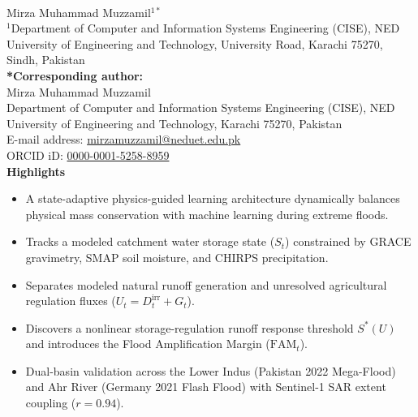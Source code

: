 \documentclass[11pt,a4paper,fleqn]{article}
\begin{document}
\pagestyle{plain}
\thispagestyle{plain}


\begin{singlespace}
\\[1.5em]

\noindent Mirza Muhammad Muzzamil$^{1*}$\\[0.8em]

\noindent $^1$Department of Computer and Information Systems Engineering (CISE), NED University of Engineering and Technology, University Road, Karachi 75270, Sindh, Pakistan\\[1.2em]

\noindent \textbf{*Corresponding author:}\\
\noindent Mirza Muhammad Muzzamil\\
\noindent Department of Computer and Information Systems Engineering (CISE), NED University of Engineering and Technology, Karachi 75270, Pakistan\\
\noindent E-mail address: \href{mailto:mirzamuzzamil@neduet.edu.pk}{mirzamuzzamil@neduet.edu.pk}\\
\noindent ORCID iD: \href{https://orcid.org/0000-0001-5258-8959}{0000-0001-5258-8959}\\[1.5em]

\noindent \textbf{Highlights}
\begin{itemize}
    \item A state-adaptive physics-guided learning architecture dynamically balances physical mass conservation with machine learning during extreme floods.
    \item Tracks a modeled catchment water storage state ($S_t$) constrained by GRACE gravimetry, SMAP soil moisture, and CHIRPS precipitation.
    \item Separates modeled natural runoff generation and unresolved agricultural regulation fluxes ($U_t = D_t^{\text{irr}} + G_t$).
    \item Discovers a nonlinear storage-regulation runoff response threshold $S^*(U)$ and introduces the Flood Amplification Margin ($\text{FAM}_t$).
    \item Dual-basin validation across the Lower Indus (Pakistan 2022 Mega-Flood) and Ahr River (Germany 2021 Flash Flood) with Sentinel-1 SAR extent coupling ($r = 0.94$).
\end{itemize}
\vspace{1.0em}


\end{singlespace}
\end{document}
